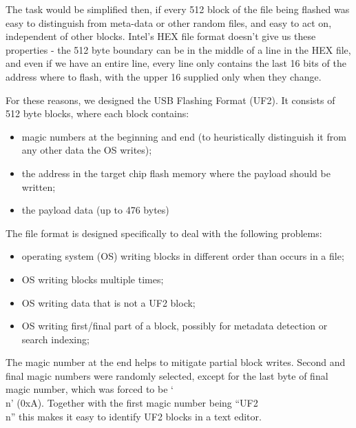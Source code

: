 The task would be simplified then, if every 512 block of the file being flashed was easy to distinguish from meta-data
or other random files, and easy to act on, independent of other blocks. Intel's HEX file format doesn't give us these properties 
- the 512 byte boundary can be in the middle of a line in the HEX file, and even if we have an entire line, every line only
contains the last 16 bits of the address where to flash, with the upper 16 supplied only when they change.

For these reasons, we designed the USB Flashing Format (UF2). It consists of 512 byte blocks, where each block contains:
\begin{itemize}
\item magic numbers at the beginning and end (to heuristically distinguish it from any other data the OS writes);
\item the address in the target chip flash memory where the payload should be written;
\item the payload data (up to 476 bytes)
\end{itemize}



The file format is designed specifically to deal with the following problems:

\begin{itemize}
\item operating system (OS) writing blocks in different order than occurs in a file;
\item OS writing blocks multiple times;
\item OS writing data that is not a UF2 block;
\item OS writing first/final part of a block, possibly for metadata detection or search indexing;
\end{itemize}

The magic number at the end helps to mitigate partial block writes.
Second and final magic numbers were randomly selected, 
except for the last byte of final magic number, which was forced to be `\\n' (0xA). 
Together with the first magic number being ``UF2\\n'' this makes it easy to identify UF2 blocks in a text editor.


